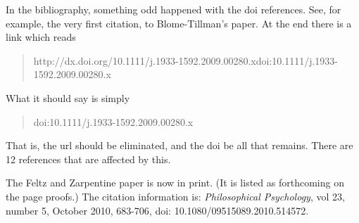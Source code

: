 \documentclass[]{article}
\begin{document}
In the bibliography, something odd happened with the doi references. See, for example, the very first citation, to Blome-Tillman's paper. At the end there is a link which reads

\begin{quote}
http://dx.doi.org/10.1111/j.1933-1592.2009.00280.xdoi:10.1111/j.1933-1592.2009.00280.x
\end{quote}

What it should say is simply

\begin{quote}
doi:10.1111/j.1933-1592.2009.00280.x
\end{quote}

That is, the url should be eliminated, and the doi be all that remains. There are 12 references that are affected by this.

The Feltz and Zarpentine paper is now in print. (It is listed as forthcoming on the page proofs.) The citation information is: \textit{Philosophical Psychology}, vol 23, number 5, October 2010, 683-706, doi: 10.1080/09515089.2010.514572.
\end{document}
